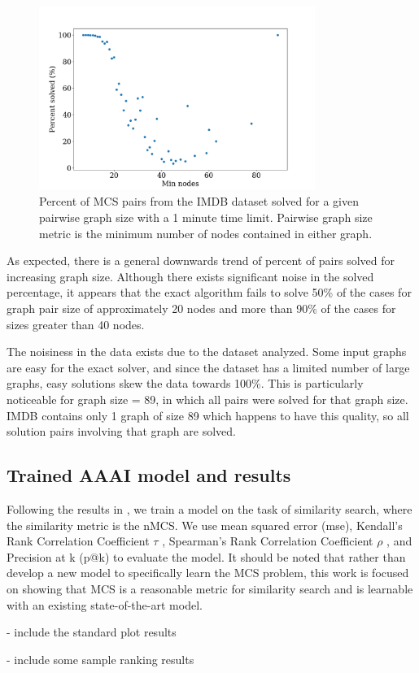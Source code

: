 \begin{figure}
    \center
    \includegraphics[width=0.8\textwidth]{figures/pct_solved_avg_nodes.png}
    \caption{Percent of MCS pairs from the IMDB dataset solved for a given pairwise graph size with a 1 minute time limit. Pairwise graph size metric is the minimum number of nodes contained in either graph.}
    \label{fig:solution_limits}
\end{figure}

As expected, there is a general downwards trend of percent of pairs solved for increasing graph size. Although there exists significant noise in the solved percentage, it appears that the exact algorithm fails to solve 50\% of the cases for graph pair size of approximately 20 nodes and more than 90\% of the cases for sizes greater than 40 nodes.

The noisiness in the data exists due to the dataset analyzed. Some input graphs are easy for the exact solver, and since the dataset has a limited number of large graphs, easy solutions skew the data towards 100\%. This is particularly noticeable for graph size = 89, in which all pairs were solved for that graph size. IMDB contains only 1 graph of size 89 which happens to have this quality, so all solution pairs involving that graph are solved.

\subsection{Trained AAAI model and results}
Following the results in \cite{bai2018convolutional}, we train a model on the task of similarity search, where the similarity metric is the nMCS. We use mean squared error (mse), Kendall's Rank Correlation Coefficient $\tau$ \cite{kendall1938new}, Spearman's Rank Correlation Coefficient $\rho$ \cite{spearman1904proof}, and Precision at k (p@k) to evaluate the model. It should be noted that rather than develop a new model to specifically learn the MCS problem, this work is focused on showing that MCS is a reasonable metric for similarity search and is learnable with an existing state-of-the-art model.



- include the standard plot results

- include some sample ranking results

